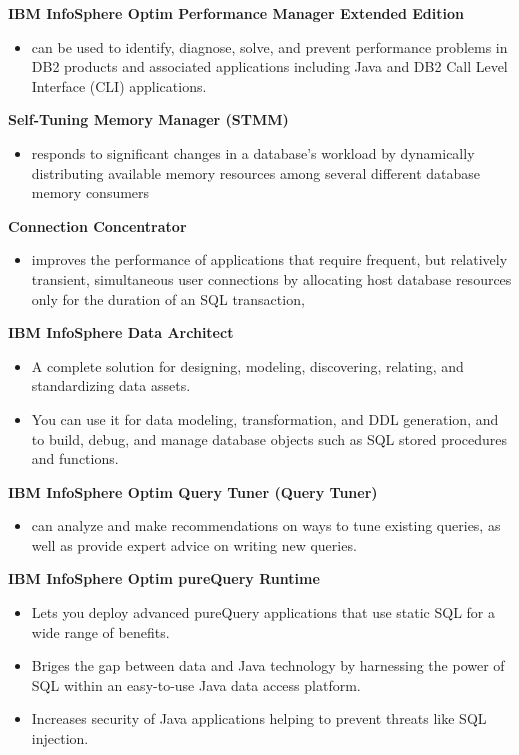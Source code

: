 \documentclass{article}
\begin{document}
\textbf{IBM InfoSphere Optim Performance Manager Extended Edition}
\begin{itemize}
\item can be used to identify, diagnose, solve, and prevent performance problems in DB2 products and 
associated applications including Java and DB2 Call Level Interface (CLI) applications.
\end{itemize}

\textbf{Self-Tuning Memory Manager (STMM)}
\begin{itemize}
\item responds to significant changes in a database's workload by dynamically distributing available
memory resources among several different database memory consumers
\end{itemize}

\textbf{Connection Concentrator}
\begin{itemize}
\item improves the performance of applications that require frequent, but relatively transient, 
simultaneous user connections by allocating host database resources only for the duration of an 
SQL transaction,
\end{itemize}

\textbf{IBM InfoSphere Data Architect}
\begin{itemize}
\item A complete solution for designing, modeling, discovering, relating, and standardizing data assets.
\item You can use it for data modeling, transformation, and DDL generation, and to build, debug, and
manage database objects such as SQL stored procedures and functions.
\end{itemize}

\textbf{IBM InfoSphere Optim Query Tuner (Query Tuner)}
\begin{itemize}
\item can analyze and make recommendations on ways to tune existing queries, as well as provide expert
advice on writing new queries.
\end{itemize}

\textbf{IBM InfoSphere Optim pureQuery Runtime}
\begin{itemize}
\item Lets you deploy advanced pureQuery applications that use static SQL for a wide range of benefits.
\item Briges the gap between data and Java technology by harnessing the power of SQL within an easy-to-use
Java data access platform.
\item Increases security of Java applications helping to prevent threats like SQL injection.
\end{itemize}
\end{document}

